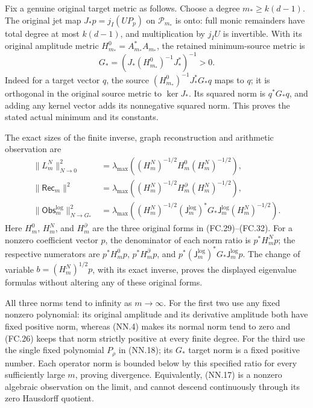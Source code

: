Fix a genuine original target metric as follows. Choose a degree
\(m_*\ge k(d-1)\). The original jet map
\(J_*p=j_I(UP_p)\) on \(\mathcal P_{m_*}\) is onto: full monic
remainders have total degree at most \(k(d-1)\), and multiplication
by \(j_IU\) is invertible. With its original amplitude metric
\(H_{m_*}^0=A_{m_*}^*A_{m_*}\), the retained minimum-source metric is
\[
 G_*=(J_*(H_{m_*}^0)^{-1}J_*^*)^{-1}>0.
 \tag{NN.19}
\]
Indeed for a target vector \(q\), the source
\((H_{m_*}^0)^{-1}J_*^*G_*q\) maps to \(q\); it is orthogonal
in the original source metric to \(\ker J_*\). Its squared norm
is \(q^*G_*q\), and adding any kernel vector adds its nonnegative
squared norm. This proves the stated actual minimum and its constants.

The exact sizes of the finite inverse, graph reconstruction and
arithmetic observation are
\[
 \begin{aligned}
 \|L_m^N\|_{N\to0}^2
   &=\lambda_{\max}((H_m^N)^{-1/2}H_m^0(H_m^N)^{-1/2}),\\
 \|\mathsf{Rec}_m\|^2
   &=\lambda_{\max}((H_m^N)^{-1/2}H_m^\partial(H_m^N)^{-1/2}),\\
 \|\mathsf{Obs}_m^{\log}\|_{N\to G_*}^2
   &=\lambda_{\max}((H_m^N)^{-1/2}
          (\mathsf J_m^{\log})^*G_*\mathsf J_m^{\log}
                                            (H_m^N)^{-1/2}).
 \end{aligned}
 \tag{NN.20}
\]
Here \(H_m^0\), \(H_m^N\), and \(H_m^\partial\) are the three
original forms in (FC.29)--(FC.32). For a nonzero coefficient vector
\(p\), the denominator of each norm ratio is \(p^*H_m^Np\);
the respective numerators are \(p^*H_m^0p\),
\(p^*H_m^\partial p\), and
\(p^*(\mathsf J_m^{\log})^*G_*\mathsf J_m^{\log}p\).
The change of variable \(b=(H_m^N)^{1/2}p\), with its exact inverse,
proves the displayed eigenvalue formulas without altering any of these
original forms.

All three norms tend to infinity as \(m\to\infty\). For the first
two use any fixed nonzero polynomial: its original amplitude and its
derivative amplitude both have fixed positive norm, whereas (NN.4)
makes its normal norm tend to zero and (FC.26) keeps that norm strictly
positive at every finite degree. For the third use the single fixed
polynomial \(P_\rho\) in (NN.18); its \(G_*\) target norm is a
fixed positive number. Each operator norm is bounded below by this
specified ratio for every sufficiently large \(m\), proving divergence.
Equivalently, (NN.17) is a nonzero algebraic observation on the limit,
and cannot descend continuously through its zero Hausdorff quotient.

